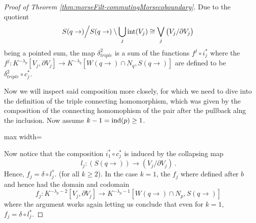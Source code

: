 \begin{proof}[Proof of Theorem \ref{thm:morseFilt-commutingMorsecoboundary}]
		Due to the quotient
		\begin{equation*}
			S(q\to)\Big/S(q\to)\setminus \bigcup\limits_j \operatorname{\mathrm{int}}(V_j)\cong \bigvee_j \big(V_j/\partial V_j\big)\,
		\end{equation*}being a pointed sum, the map $\delta^2_{triple}$ is a sum of the functions $f^j\circ i_j^*$ where the $f^j:K^{-\lambda_p}\left[ V_j,\partial V_j \right]\to K^{-\lambda_q}\left[W(q\to)\cap N_q,S(q\to) \right]$ are defined to be $\delta^2_{triple}\circ c_j^*$.
		
		Now we will inspect said composition more closely, for which we need to dive into the definition of the triple connecting homomorphism, which was given by the composition of the connecting homomophism of the pair after the pullback alng the inclusion. Now assume $k-1=\mathrm{ind}(p)\geq 1$. 
\begin{fdiagram}
\begin{adjustbox}{max width=\textwidth}


\end{adjustbox}
\end{fdiagram}
Now notice that the composition $i_1^*\circ c_j^*$ is induced by the collapsing map 
\begin{equation*}
	l_j:(S(q\to)) \to (V_j\big/ \partial V_j)\,.
\end{equation*} 
Hence, $f_j=\delta\circ l_j^*$. (for all $k\geq 2$). 
In the case $k=1$, the $f_j$ where defined after $b$ and hence had the domain and codomain 
\begin{equation*}
	f_j:K^{-\lambda_p-2}\left[ V_j,\partial V_j \right] \to K^{-\lambda_p-1}\left[W(q\to)\cap N_p,S(q\to)\right]
\end{equation*} where the argument works again letting us conclude that 
even for $k=1$, $f_j=\delta\circ l_j^*$.


\end{proof}
